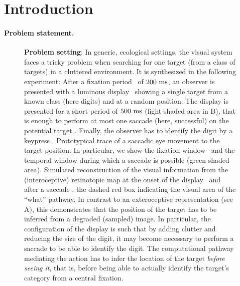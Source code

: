 \section{Introduction}
\label{sec:intro}
\paragraph{Problem statement.}
\begin{figure}[t!]%
	\caption{%
		{\bf Problem setting}: In generic, ecological settings, the visual system faces a tricky problem when searching for one target (from a class of targets) in a cluttered environment. It is synthesized in the following experiment: %
		\A After a fixation period \FIX\ of $200~\si{\milli\second}$, an observer is presented with a luminous display \DIS\ showing a single target from a known class (here digits) and at a random position. The display is presented for a short period of $500~\si{\milli\second}$ (light shaded area in B), that is enough to perform at most one saccade (here, successful) on the potential target \SAC . Finally, the observer has to identify the digit by a keypress \ANS . %
		\B Prototypical trace of a saccadic eye movement to the target position. In particular, we show the fixation window \FIX\ and the temporal window during which a saccade is possible (green shaded area). %
		\C Simulated reconstruction of the visual information from the (interoceptive) retinotopic map at the onset of the display \DIS\ and after a saccade \SAC , the dashed red box indicating the visual area of the ``what'' pathway. In contrast to an exteroceptive representation (see A), this demonstrates that the position of the target has to be inferred from a degraded (sampled) image. In particular, the configuration of the display is such that by adding clutter and reducing the size of the digit, it may become necessary to perform a saccade to be able to identify the digit. The computational pathway mediating the action has to infer the location of the target \emph{before seeing it}, that is, before being able to actually identify the target's category from a central fixation. %
		\label{fig:intro}}%
\end{figure}%


